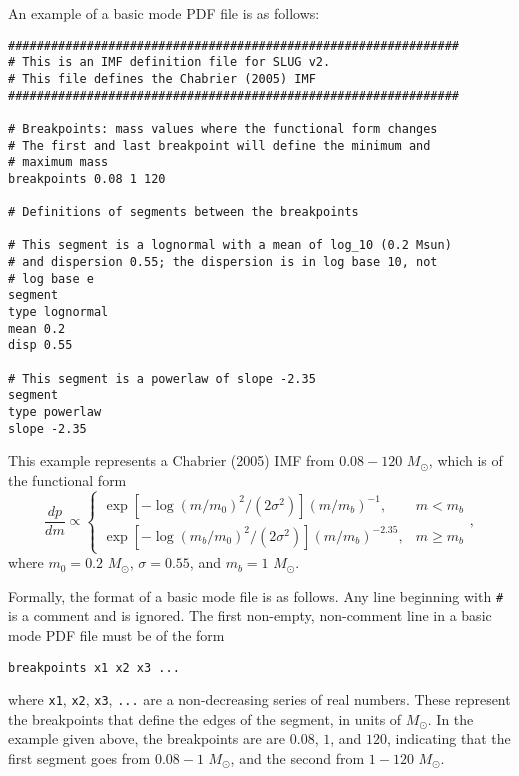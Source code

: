 \documentclass[12pt]{article}
\begin{document}
An example of a basic mode PDF file is as follows:
\begin{verbatim}
###############################################################
# This is an IMF definition file for SLUG v2.
# This file defines the Chabrier (2005) IMF          
###############################################################

# Breakpoints: mass values where the functional form changes
# The first and last breakpoint will define the minimum and
# maximum mass
breakpoints 0.08 1 120

# Definitions of segments between the breakpoints

# This segment is a lognormal with a mean of log_10 (0.2 Msun) 
# and dispersion 0.55; the dispersion is in log base 10, not 
# log base e
segment
type lognormal
mean 0.2
disp 0.55

# This segment is a powerlaw of slope -2.35
segment
type powerlaw
slope -2.35
\end{verbatim}
This example represents a Chabrier (2005) IMF from $0.08 - 120$ $M_\odot$, which is of the functional form
\begin{equation}
\frac{dp}{dm} \propto \left\{
\begin{array}{ll}
\exp[-\log(m/m_0)^2/(2\sigma^2)] (m/m_b)^{-1} , & m < m_b \\
\exp[-\log(m_b/m_0)^2/(2\sigma^2)] (m/m_b)^{-2.35}, & m \geq m_b
\end{array}
\right.,
\end{equation}
where $m_0 = 0.2$ $M_\odot$, $\sigma = 0.55$, and $m_b = 1$ $M_\odot$.

Formally, the format of a basic mode file is as follows. Any line beginning with \verb=#= is a comment and is ignored. The first non-empty, non-comment line in a basic mode PDF file must be of the form
\begin{verbatim}
breakpoints x1 x2 x3 ...
\end{verbatim}
where \verb=x1=, \verb=x2=, \verb=x3=, \verb=...= are a non-decreasing series of real numbers. These represent the breakpoints that define the edges of the segment, in units of $M_\odot$. In the example given above, the breakpoints are are $0.08$, $1$, and $120$, indicating that the first segment goes from $0.08 - 1$ $M_\odot$, and the second from $1 - 120$ $M_\odot$.
\end{document}

